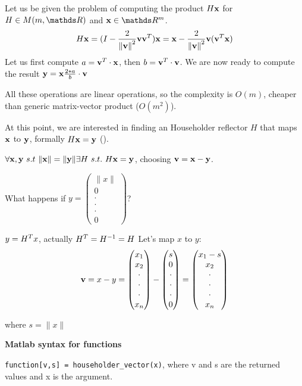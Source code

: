 \documentclass[computationalMathematics.tex]{subfiles}
\begin{document}

\begin{example}
	Let us be given the problem of computing the product $H {\bf x }$ for $H \in M(m, \R)$ and $\vect{x} \in \R^m$.
	\[
		H{\bf x } = (I - \frac{2}{{\|{\bf v }\|}^{2}} {\bf v } {{\bf v }}^{T}){\bf x } = {\bf x } - \frac{2}{{\|{\bf v }\|}^{2}} {\bf v } ({{\bf v }}^{T} {\bf x })
	\]
Let us first compute $a = {{\bf v }}^{T} \cdot {\bf x }$, then $b= {{\bf v }}^{T} \cdot {\bf v }$.
We are now ready to compute the result ${\bf y } = {\bf x } \frac{2*a}{b} \cdot {\bf v }$

All these operations are linear operations, so the complexity is $O(m)$, cheaper than generic matrix-vector product ($O(m^2)$).
\end{example}

At this point, we are interested in finding an Householder reflector $H$ that maps ${\bf x }$ to ${\bf y }$, formally $H{\bf x } = {\bf y }$ ().

\begin{lemma}
 $\forall {\bf x }, {\bf y } ~ s.t ~ \|{\bf x }\| = \|{\bf y }\| \exists H ~ s.t. ~ H{\bf x } = {\bf y }$, choosing ${\bf v } = {\bf x } - {\bf y }$.
\end{lemma}


What happens if $y = \begin{pmatrix} \|x\|\\ 0\\ \cdot\\ \cdot\\ \cdot\\ 0\end{pmatrix}$?
  
  $y = {H}^{T}x$, actually ${H}^{T} = {H}^{-1} = H$
  Let's map $x$ to $y$: 
  \[
    {\bf v } = x - y =
  \begin{pmatrix} {}x_{1}\\ {x}_{2}\\ \cdot\\ \cdot\\ \cdot\\{x}_{n}\end{pmatrix} - \begin{pmatrix} s\\ 0\\ \cdot\\ \cdot\\ \cdot\\ 0 \end{pmatrix} = 
    \begin{pmatrix} {x}_{1}-s\\ {x}_{2}\\ \cdot\\ \cdot\\ \cdot\\ {x}_{n} \end{pmatrix}
  \]
      
      where $s = \|x\|$

\textbf{Matlab syntax for functions}

{\tt function[v,s] = householder\_vector(x)}, where v and s are the returned values and x is the argument.
\end{document}

